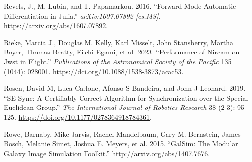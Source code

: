 \documentclass[
]{article}
\newlength{\cslhangindent}
\newenvironment{cslreferences}%
  {\setlength{\parindent}{0pt}%
  \everypar{\setlength{\hangindent}{\cslhangindent}}\ignorespaces}%
  {\par}
\begin{document}
\begin{cslreferences}
\leavevmode\hypertarget{ref-RevelsLubinPapamarkou2016}{}%
Revels, J., M. Lubin, and T. Papamarkou. 2016. ``Forward-Mode Automatic
Differentiation in Julia.'' \emph{arXiv:1607.07892 {[}cs.MS{]}}.
\url{https://arxiv.org/abs/1607.07892}.

\leavevmode\hypertarget{ref-Rieke_2023}{}%
Rieke, Marcia J., Douglas M. Kelly, Karl Misselt, John Stansberry,
Martha Boyer, Thomas Beatty, Eiichi Egami, et al. 2023. ``Performance of
Nircam on Jwst in Flight.'' \emph{Publications of the Astronomical
Society of the Pacific} 135 (1044): 028001.
\url{https://doi.org/10.1088/1538-3873/acac53}.

\leavevmode\hypertarget{ref-doi:10.1177ux2f0278364918784361}{}%
Rosen, David M, Luca Carlone, Afonso S Bandeira, and John J Leonard.
2019. ``SE-Sync: A Certifiably Correct Algorithm for Synchronization
over the Special Euclidean Group.'' \emph{The International Journal of
Robotics Research} 38 (2-3): 95--125.
\url{https://doi.org/10.1177/0278364918784361}.

\leavevmode\hypertarget{ref-rowe2015galsim}{}%
Rowe, Barnaby, Mike Jarvis, Rachel Mandelbaum, Gary M. Bernstein, James
Bosch, Melanie Simet, Joshua E. Meyers, et al. 2015. ``GalSim: The
Modular Galaxy Image Simulation Toolkit.''
\url{http://arxiv.org/abs/1407.7676}.
\end{cslreferences}
\end{document}
